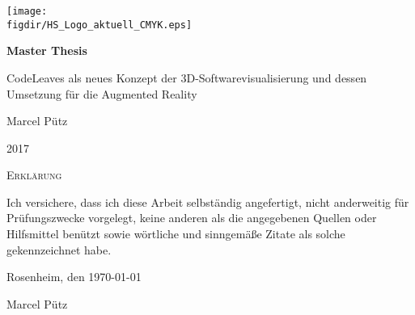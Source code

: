 \begin{titlepage}

\raggedleft
\sffamily

\texttt{[image: \\figdir/HS\_Logo\_aktuell\_CMYK.eps]}
\vfill

\centering
\huge
\textbf{Master Thesis}
\vspace{1cm}

\LARGE
CodeLeaves als neues Konzept der 3D-Softwarevisualisierung und dessen Umsetzung für die Augmented Reality
\vspace{1cm}

\vfill
\Large
Marcel Pütz

2017


\end{titlepage}

\cleardoubleemptypage

{
\large
\thispagestyle{empty}
\vspace*{\fill}

\noindent
\textsc{Erklärung}

\medskip

\noindent
Ich versichere, dass ich diese Arbeit selbständig
angefertigt, nicht anderweitig für Prüfungszwecke
vorgelegt, keine anderen als die angegebenen Quellen
oder Hilfsmittel benützt sowie wörtliche und
sinngemäße Zitate als solche gekennzeichnet habe.

\bigskip

\noindent
Rosenheim, den \today

\vspace*{2cm}

\noindent
Marcel Pütz
}

